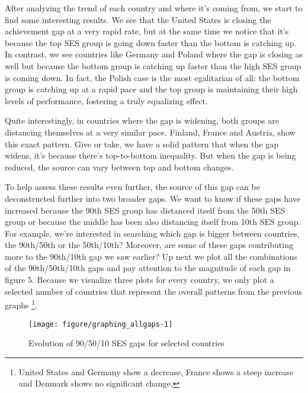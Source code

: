 \documentclass[11pt, a4paper]{article}\usepackage[]{graphicx}\usepackage[]{color}
\begin{document}
After analyzing the trend of each country and where it's coming from, we start to find some interesting results. We see that the United States is closing the achievement gap at a very rapid rate, but at the same time we notice that it's because the top SES group is going down faster than the bottom is catching up. In contrast, we see countries like Germany and Poland where the gap is closing as well but because the bottom group is catching up faster than the high SES group is coming down. In fact, the Polish case is the most egalitarian of all: the bottom group is catching up at a rapid pace and the top group is maintaining their high levels of performance, fostering a truly equalizing effect.

Quite interestingly, in countries where the gap is widening, both groups are distancing themselves at a very similar pace. Finland, France and Austria, show this exact pattern. Give or take, we have a solid pattern that when the gap widens, it's because there's top-to-bottom inequality. But when the gap is being reduced, the source can vary between top and bottom changes.

To help assess these results even further, the source of this gap can be deconstructed further into two broader gaps. We want to know if these gaps have increased because the 90th SES group has distanced itself from the 50th SES group or because the middle has been also distancing itself from 10th SES group. For example, we're interested in searching which gap is bigger between countries, the 90th/50th or the 50th/10th? Moreover, are some of these gaps contributing more to the 90th/10th gap we saw earlier? Up next we plot all the combinations of the 90th/50th/10th gaps and pay attention to the magnitude of each gap in figure 5. Because we visualize three plots for every country, we only plot a selected number of countries that represent the overall patterns from the previous graphs \footnote{United States and Germany show a decrease, France shows a steep increase and Denmark shows no significant change.}.

\begin{figure}

{\centering \texttt{[image: figure/graphing\_allgaps-1]} 

}

\caption[Evolution of 90/50/10 SES gaps for selected countries]{Evolution of 90/50/10 SES gaps for selected countries}\label{fig:graphing_allgaps}
\end{figure}
\end{document}
